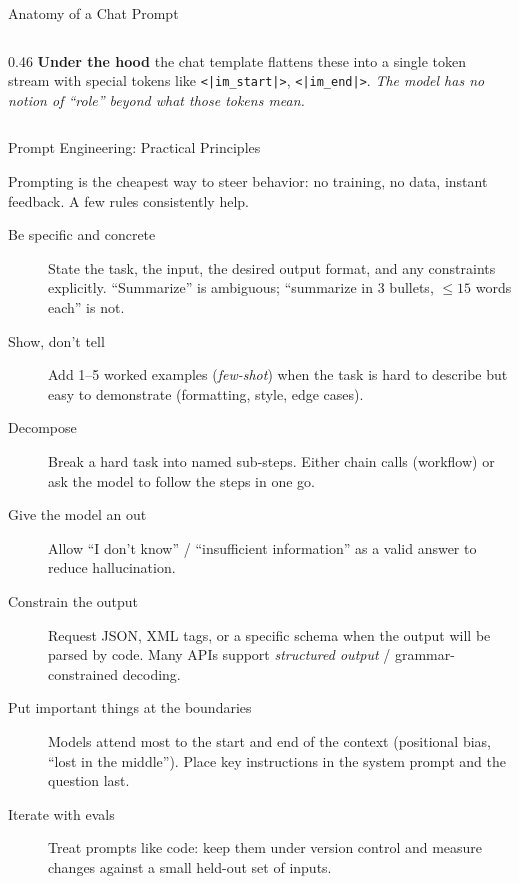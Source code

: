 \begin{frame}{Anatomy of a Chat Prompt}
\begin{columns}
\begin{column}{0.46\textwidth}
      \vspace{0.3em}
      \textbf{Under the hood} the chat template flattens these into a single token stream
      with special tokens like \texttt{<|im\_start|>}, \texttt{<|im\_end|>}.
      \emph{The model has no notion of ``role'' beyond what those tokens mean.}
    \end{column}
  \end{columns}
\end{frame}

\begin{frame}{Prompt Engineering: Practical Principles}

  Prompting is the cheapest way to steer behavior: no training, no data, instant feedback.
  A few rules consistently help.

  \vspace{0.3em}
  \begin{description}
    \item[Be specific and concrete] State the task, the input, the desired output format,
      and any constraints explicitly. ``Summarize'' is ambiguous; ``summarize in 3 bullets,
      $\le 15$ words each'' is not.
    \item[Show, don't tell] Add 1--5 worked examples (\emph{few-shot}) when the task is
      hard to describe but easy to demonstrate (formatting, style, edge cases).
    \item[Decompose] Break a hard task into named sub-steps. Either chain calls
      (workflow) or ask the model to follow the steps in one go.
    \item[Give the model an out] Allow ``I don't know'' / ``insufficient information'' as a
      valid answer to reduce hallucination.
    \item[Constrain the output] Request JSON, XML tags, or a specific schema when the
      output will be parsed by code. Many APIs support \emph{structured output}
      / grammar-constrained decoding.
    \item[Put important things at the boundaries] Models attend most to the start and
      end of the context (positional bias, ``lost in the middle''). Place key
      instructions in the system prompt and the question last.
    \item[Iterate with evals] Treat prompts like code: keep them under version control
      and measure changes against a small held-out set of inputs.
  \end{description}
\end{frame}


